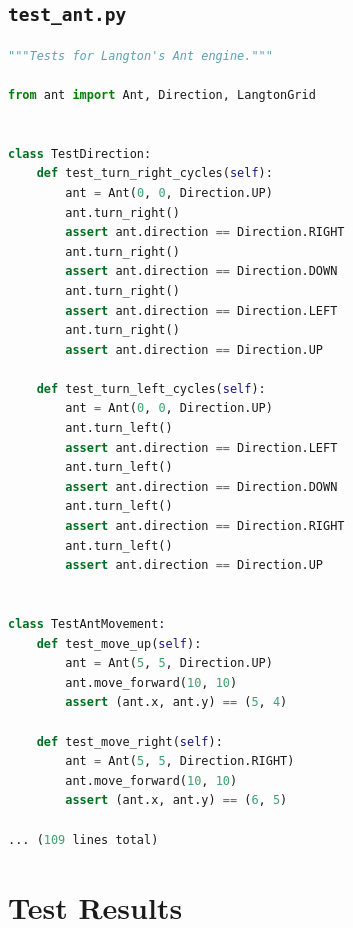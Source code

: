 \documentclass[11pt,a4paper]{article}
\begin{document}
\subsection*{\texttt{test\_ant.py}}
\begin{lstlisting}[language=Python]
"""Tests for Langton's Ant engine."""

from ant import Ant, Direction, LangtonGrid


class TestDirection:
    def test_turn_right_cycles(self):
        ant = Ant(0, 0, Direction.UP)
        ant.turn_right()
        assert ant.direction == Direction.RIGHT
        ant.turn_right()
        assert ant.direction == Direction.DOWN
        ant.turn_right()
        assert ant.direction == Direction.LEFT
        ant.turn_right()
        assert ant.direction == Direction.UP

    def test_turn_left_cycles(self):
        ant = Ant(0, 0, Direction.UP)
        ant.turn_left()
        assert ant.direction == Direction.LEFT
        ant.turn_left()
        assert ant.direction == Direction.DOWN
        ant.turn_left()
        assert ant.direction == Direction.RIGHT
        ant.turn_left()
        assert ant.direction == Direction.UP


class TestAntMovement:
    def test_move_up(self):
        ant = Ant(5, 5, Direction.UP)
        ant.move_forward(10, 10)
        assert (ant.x, ant.y) == (5, 4)

    def test_move_right(self):
        ant = Ant(5, 5, Direction.RIGHT)
        ant.move_forward(10, 10)
        assert (ant.x, ant.y) == (6, 5)

... (109 lines total)
\end{lstlisting}

\section{Test Results}
\end{document}
